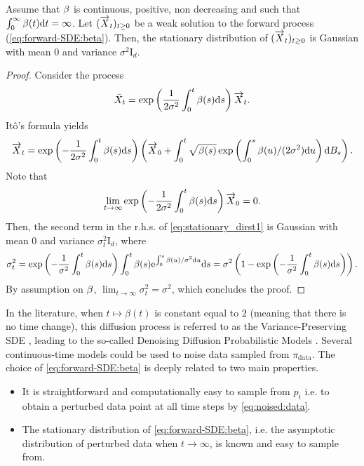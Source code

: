 \documentclass[english,graybox,envcountchap,envcountsame,sectrefs,shortlabels]{svmono}
\theoremstyle{style}
\newcommand{\rme}{\mathrm{e}}
\newcommand{\eqsp}{}
\begin{document}
\begin{lemma}\label{lem:stat:forward}
    Assume that $\beta$ is continuous, positive, non decreasing and such that $\int_0^\infty \beta(t)\mathrm{d} t = \infty$. Let $(\overrightarrow X_t)_{t\geq 0}$ be a weak solution to the forward process (\ref{eq:forward-SDE:beta}). Then, the stationary distribution of $(\overrightarrow X_t)_{t\geq 0}$ is Gaussian with mean 0 and variance $\sigma^2 \mathrm{I}_d$.
\end{lemma}

\begin{proof}
Consider the process
\begin{align*}
\bar X_t = \exp \left(\frac{1}{2 \sigma^2} \int_0^t \sched(s) \rmd s\right) \ora X_t\eqsp. 
\end{align*}
It\^o's formula yields
\begin{equation*}\label{eq:stationary_dirst1}
    \ora X_t  =  \exp \left(-\frac{1}{2 \sigma^2} \int_0^t \sched(s) \rmd s\right) \left(\ora X_0 +  \int_0^t \sqrt{ \sched(s)} \exp \left( \int_0^s \sched(u)/(2\sigma^2) \rmd u\right) \rmd B_s\right)\eqsp.
\end{equation*}
Note that
\begin{align*}
\lim_{t\to\infty}\exp \left(-\frac{1}{2 \sigma^2} \int_0^t \sched(s) \rmd s\right) \ora X_0 = 0\eqsp.
\end{align*}
Then, the second term in the r.h.s. of \eqref{eq:stationary_dirst1} is Gaussian with mean $0$ and variance $\sigma^2_t \mathrm{I}_d$, where
\begin{equation*}
\sigma^2_t = \exp \left(-\frac{1}{ \sigma^2} \int_0^t \sched(s) \rmd s\right) \int_0^t \sched(s) \rme^{ \int_0^s \sched(u)/\sigma^2 \rmd u} \rmd s = \sigma^2 \left( 1 - \exp \left(-\frac{1}{ \sigma^2} \int_0^t \sched(s) \rmd s\right) \right)\eqsp.
\end{equation*}
By assumption on $\beta$, $\lim_{t \to \infty} \sigma_t^2  = \sigma^2$, which concludes the proof. 
\end{proof}
In the literature, when $t\mapsto\beta(t)$ is constant equal to $2$ (meaning that there is no time change), this diffusion process is referred  to as the Variance-Preserving SDE 
\cite{conforti2023}, leading to the so-called  
Denoising Diffusion Probabilistic Models \cite{ho2020denoising}.
Several continuous-time models could be used to noise data sampled from $\pi_{\mathrm{data}}$. The choice of \eqref{eq:forward-SDE:beta} is deeply related to two main properties.
\begin{itemize}
\item It is straightforward and computationally easy to sample from $p_t$ i.e. to obtain a perturbed data point at all time steps by \eqref{eq:noised:data}.
\item The stationary distribution of \eqref{eq:forward-SDE:beta}, i.e. the asymptotic distribution of perturbed data when $t\to \infty$, is known and easy to sample from.
\end{itemize}
\end{document}
